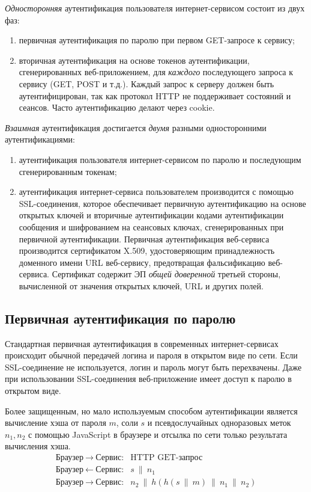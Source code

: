 \documentclass[10pt,a4paper]{book}
\begin{document}
\emph{Односторонняя} аутентификация пользователя интернет-сервисом состоит из двух фаз:
\begin{enumerate}
    \item первичная аутентификация по паролю при первом GET-запросе к сервису;
    \item вторичная аутентификация на основе токенов аутентификации, сгенерированных веб-приложением, для \emph{каждого} последующего запроса к сервису (GET, POST и т.д.). Каждый запрос к серверу должен быть аутентифицирован, так как протокол HTTP не поддерживает состояний и сеансов. Часто аутентификацию делают через cookie.
\end{enumerate}

\emph{Взаимная} аутентификация достигается \emph{двумя} разными односторонними аутентификациями:
\begin{enumerate}
    \item аутентификация пользователя интернет-сервисом по паролю и последующим сгенерированным токенам;
    \item аутентификация интернет-сервиса пользователем производится с помощью SSL-соединения, которое обеспечивает первичную аутентификацию на основе открытых ключей и вторичные аутентификации кодами аутентификации сообщения и шифрованием на сеансовых ключах, сгенерированных при первичной аутентификации. Первичная аутентификация веб-сервиса производится сертификатом X.509, удостоверяющим принадлежность доменного имени URL веб-сервису, предотвращая фальсификацию веб-сервиса. Сертификат содержит ЭП \emph{общей доверенной} третьей стороны, вычисленной от значения открытых ключей, URL и других полей.
\end{enumerate}


\subsection{Первичная аутентификация по паролю}

Стандартная первичная аутентификация в современных интернет-сервисах происходит обычной передачей логина и пароля в открытом виде по сети. Если SSL-соединение не используется, логин и пароль могут быть перехвачены. Даже при использовании SSL-соединения веб-приложение имеет доступ к паролю в открытом виде.

Более защищенным, но мало используемым способом аутентификации является вычисление хэша от пароля $m$, соли $s$ и псевдослучайных одноразовых меток $n_1, n_2$ с помощью JavaScript в браузере и отсылка по сети только результата вычисления хэша.
\[ \begin{array}{ll}
    \text{Браузер} ~\rightarrow~ \text{Сервис:} & \text{HTTP GET-запрос} \\
    \text{Браузер} ~\leftarrow~ \text{Сервис:}  & s ~\|~ n_1 \\
    \text{Браузер} ~\rightarrow~ \text{Сервис:} & n_2 ~\|~ h( h(s ~\|~ m) ~\|~ n_1 ~\|~ n_2) \\
\end{array} \]
\end{document}
